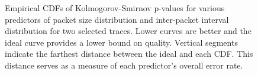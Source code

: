 \documentclass[conference]{IEEEtran}
\begin{document}
\begin{figure}[t]
\vspace{-1em}
\begin{center}
\caption{%
Empirical CDFs of Kolmogorov-Smirnov p-values for various predictors of packet size distribution and inter-packet interval distribution for two selected traces. Lower curves are better and the ideal curve provides a lower bound on quality.
Vertical segments indicate the farthest distance between the ideal and each CDF.
This distance serves as a measure of each predictor's overall error rate.
}
\end{center}
\vspace{-1.5em}
\end{figure}
\end{document}
